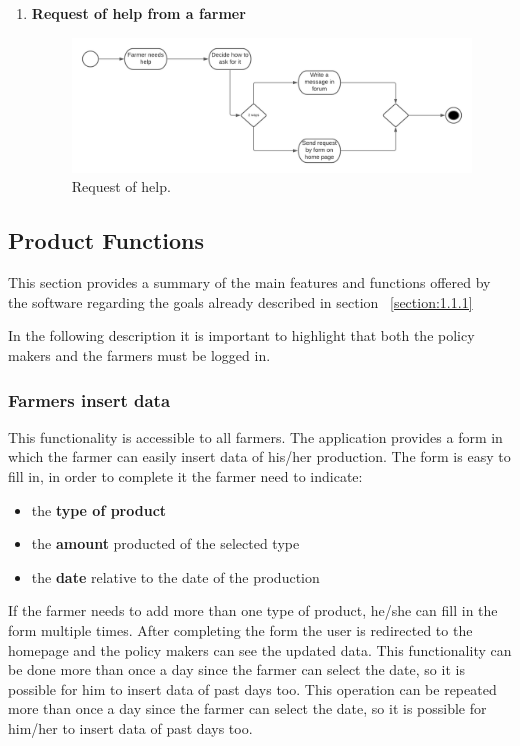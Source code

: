 \begin{enumerate}
    \item \textbf{Request of help from a farmer}
    \begin{figure}[H]
        \begin{center}
        \includegraphics[width=1\textwidth]{images/State chart 3.png}
        \caption{Request of help.}
        \label{fig:state3}
        \end{center}
    \end{figure}
\end{enumerate}
\newpage
\subsection{Product Functions}\label{subsection:2.2}
This section provides a summary of the main features and 
functions offered by the software regarding
the goals already described in section ~\ref{section:1.1.1}

In the following description it is important to highlight that both
the policy makers and the farmers must be logged in.

\subsubsection{Farmers insert data} 
This functionality is accessible to all farmers. 
The application provides a form in which the farmer can easily insert data of his/her production.
The form is easy to fill in, in order to complete it the farmer need to indicate:
\begin{itemize}
    \item the \textbf{type of product}
    \item the \textbf{amount} producted of the selected type
    \item the \textbf{date} relative to the date of the production
\end{itemize}
If the farmer needs to add more than one type of product, 
he/she can fill in the form multiple times.
After completing the form the user is redirected to the homepage and the policy makers 
can see the updated data.
This functionality can be done more than once a day since the farmer can select the date, 
so it is possible for him to insert data of past days too.
This operation can be repeated more than once a day since the farmer can select the date, so it is possible for him/her to insert data of past days too.




